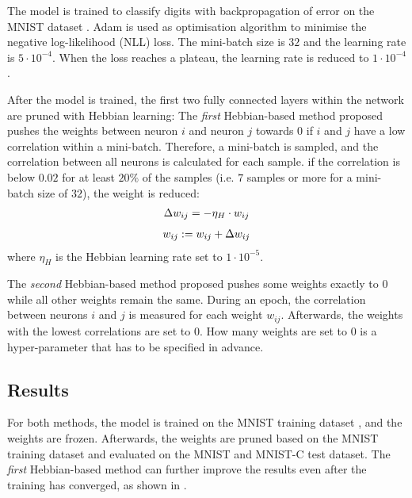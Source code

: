 The model is trained to classify digits with backpropagation of error on the MNIST dataset \cite{Lecun_Bottou_Bengio_Haffner_1998}.
Adam  is used as optimisation algorithm to minimise the negative log-likelihood (NLL) loss.
The mini-batch size is \(32\) and the learning rate is \(5\cdot 10^{-4}\).
When the loss reaches a plateau, the learning rate is reduced to \(1\cdot 10^{-4}\).

After the model is trained, the first two fully connected layers within the network are pruned with Hebbian learning:
The \emph{first} Hebbian-based method proposed pushes the weights between neuron \(i\) and neuron \(j\) towards \(0\) if \(i\) and \(j\) have a low correlation within a mini-batch.
Therefore, a mini-batch is sampled, and the correlation between all neurons is calculated for each sample.
if the correlation is below \(0.02\) for at least \(20\%\) of the samples (i.e. \(7\) samples or more for a mini-batch size of \(32\)), the weight is reduced:
\begin{align}\eqlbl{hebb_towards_0}
	\Delta w_{ij} = - \eta_H \cdot w_{ij}
\end{align}
\begin{align}\eqlbl{hebb_towards_00}
	w_{ij} := w_{ij} + \Delta w_{ij}
\end{align}
%
where \(\eta_H\) is the Hebbian learning rate set to \(1\cdot 10^{-5}\).

The \emph{second} Hebbian-based method proposed pushes some weights exactly to \(0\) while all other weights remain the same.
During an epoch, the correlation between neurons \(i\) and \(j\) is measured for each weight \(w_{ij}\).
Afterwards, the weights with the lowest correlations are set to \(0\).
How many weights are set to \(0\) is a hyper-parameter that has to be specified in advance.


\subsection{Results}
For both methods, the model is trained on the MNIST training dataset \cite{MNIST}, and the weights are frozen.
Afterwards, the weights are pruned based on the MNIST training dataset and evaluated on the MNIST and MNIST-C \cite{Mu_Gilmer_2019} test dataset.
The \emph{first} Hebbian-based method can further improve the results even after the training has converged, as shown in .


